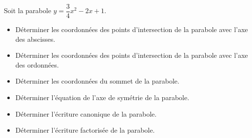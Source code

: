 \documentclass{beamer}
\begin{document}
\begin{frame}{}
Soit la parabole $y=\dfrac{3}{4}x^2-2x+1$.
\begin{itemize}
	\item Déterminer les coordonnées des points d'intersection de la parabole avec l'axe des abscisses.
	\item Déterminer les coordonnées des points d'intersection de la parabole avec l'axe des ordonnées.
	\item Déterminer les coordonnées du sommet de la parabole.
	\item Déterminer l'équation de l'axe de symétrie de la parabole.
	\item Déterminer l'écriture canonique de la parabole.
	\item Déterminer l'écriture factorisée de la parabole.
\end{itemize}

\end{frame}
\end{document}
